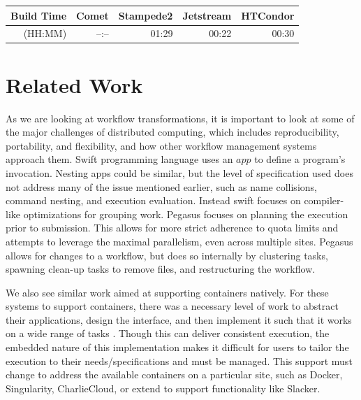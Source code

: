 \documentclass[conference]{IEEEtran}
\begin{document}
\begin{center}
\begin{tabular}{| r | r | r | r | r |}
\hline
Build Time
  & \multicolumn{1}{|c|}{Comet} 
  & \multicolumn{1}{|c|}{Stampede2} 
  & \multicolumn{1}{|c|}{Jetstream} 
  & \multicolumn{1}{|c|}{HTCondor} \\ \hline
 (HH:MM) & --:-- & 01:29 & 00:22 & 00:30 \\ \hline
\end{tabular}
\end{center}

\section{Related Work}

As we are looking at workflow 
transformations, it is important to look
at some of the major challenges of distributed
computing\cite{4404805},
which includes reproducibility, 
portability,
and flexibility, and 
how other workflow management systems
approach them.
Swift\cite{swift} programming language 
uses an $app$ to define a program's invocation.
Nesting apps could be similar, 
but the level of
specification used does
not address many of the
issue mentioned earlier, such
as name collisions, command
nesting, and execution evaluation.
Instead swift focuses on compiler-like
optimizations for grouping work\cite{Armstrong:2014:CTM:2683593.2683627}.
Pegasus\cite{pegasus} focuses on planning the
execution prior to submission.
This allows for more strict
adherence to quota limits and attempts
to leverage the maximal parallelism,
even across multiple sites\cite{chen2011constraints}.
Pegasus allows for changes to a
workflow, but does so internally by clustering
tasks\cite{chen2013balanced, chen-tcc-2015, chen-fgcs-2014}, spawning clean-up
tasks to remove files\cite{cleanup_algo}, and 
restructuring the workflow\cite{cluster_dep}.

We also see similar work aimed at 
supporting containers natively.
For these systems to support containers,
there was a necessary level of work to abstract their applications,
design the interface, and then implement it
such that it works on a wide range of tasks
\cite{wq-docker-vtdc15, containers-sciencecloud-2018,7092947,7600178}.
Though this can deliver consistent execution,
the embedded nature of this implementation makes
it difficult for users to tailor the execution
to their needs/specifications and must be
managed.
This support must change to address
the available containers on a particular site,
such as 
Docker\cite{Merkel:2014:DLL:2600239.2600241},
Singularity\cite{Singularity}, 
CharlieCloud\cite{Priedhorsky:2017:CUC:3126908.3126925},
or extend to support functionality like Slacker\cite{194430}.
\end{document}
